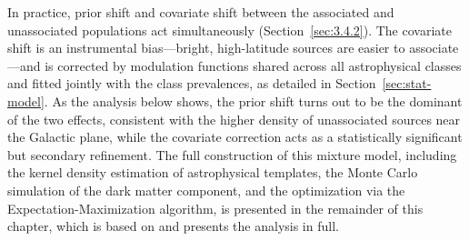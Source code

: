 In practice, prior shift and covariate shift between the associated and unassociated populations act simultaneously (Section~\ref{sec:3.4.2}).
The covariate shift is an instrumental bias---bright, high-latitude sources are easier to associate---and is corrected by modulation functions shared across all astrophysical classes and fitted jointly with the class prevalences, as detailed in Section~\ref{sec:stat-model}.
As the analysis below shows, the prior shift turns out to be the dominant of the two effects, consistent with the higher density of unassociated sources near the Galactic plane, while the covariate correction acts as a statistically significant but secondary refinement.
The full construction of this mixture model, including the kernel density estimation of astrophysical templates, the Monte Carlo simulation of the dark matter component, and the optimization via the Expectation-Maximization algorithm, is presented in the remainder of this chapter, which is based on \cite{Amerio:2025fhz} and presents the analysis in full.
